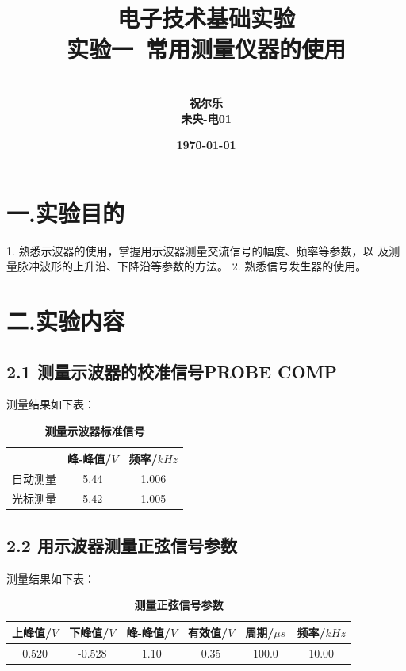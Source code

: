 \documentclass[UTF8]{ctexart}
\title{{电子技术基础实验} \\ \textbf{实验一\ 常用测量仪器的使用}}
\author{\\\textbf{祝尔乐}
        \\\textbf{未央-电01}
        }
\date{\textbf{\today}}
\begin{document}
\maketitle


\section*{一.实验目的}

1. 熟悉示波器的使用，掌握用示波器测量交流信号的幅度、频率等参数，以
及测量脉冲波形的上升沿、下降沿等参数的方法。
2. 熟悉信号发生器的使用。

\section*{二.实验内容}

\subsection*{2.1 测量示波器的校准信号PROBE COMP}

测量结果如下表：
\begin{table}[H]
    \centering
    \caption{\label{表1}\textbf{测量示波器标准信号}}
    \begin{tabular}{ccc}
    \toprule
        & 峰-峰值/$V$ &  频率/$kHz$ \\
    \midrule
        自动测量 & 5.44 &  1.006 \\
        光标测量 & 5.42 &  1.005 \\
    \bottomrule
  \end{tabular}
\end{table}


\subsection*{2.2 用示波器测量正弦信号参数}
测量结果如下表：

\begin{table}[H]
    \centering
    \caption{\label{表2}\textbf{测量正弦信号参数}}
    \begin{tabular}{cccccc}
    \toprule
        上峰值/$V$ & 下峰值/$V$ & 峰-峰值/$V$ & 有效值/$V$ & 周期/$\mu s$ & 频率/$kHz$ \\
    \midrule
        0.520 & -0.528 & 1.10 & 0.35 & 100.0 & 10.00 \\
    \bottomrule
    \end{tabular}
\end{table}
\end{document}
